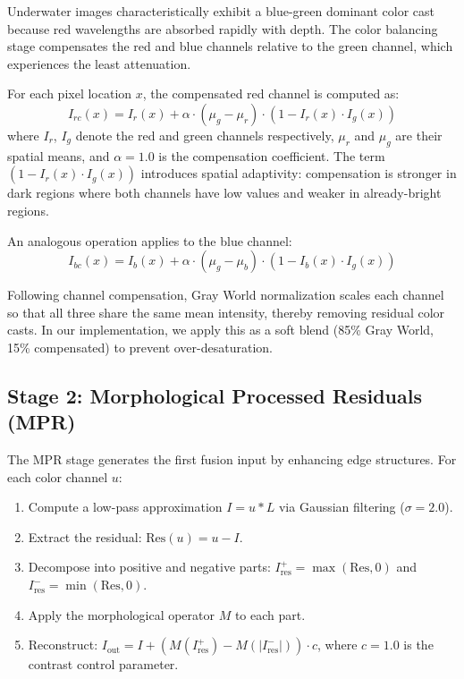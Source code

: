 \documentclass[conference]{IEEEtran}
\begin{document}
Underwater images characteristically exhibit a blue-green dominant color cast because red wavelengths are absorbed rapidly with depth. The color balancing stage compensates the red and blue channels relative to the green channel, which experiences the least attenuation.

For each pixel location $x$, the compensated red channel is computed as:
\begin{equation}
    I_{rc}(x) = I_r(x) + \alpha \cdot (\mu_g - \mu_r) \cdot (1 - I_r(x) \cdot I_g(x))
    \label{eq:red_comp}
\end{equation}
where $I_r$, $I_g$ denote the red and green channels respectively, $\mu_r$ and $\mu_g$ are their spatial means, and $\alpha = 1.0$ is the compensation coefficient. The term $(1 - I_r(x) \cdot I_g(x))$ introduces spatial adaptivity: compensation is stronger in dark regions where both channels have low values and weaker in already-bright regions.

An analogous operation applies to the blue channel:
\begin{equation}
    I_{bc}(x) = I_b(x) + \alpha \cdot (\mu_g - \mu_b) \cdot (1 - I_b(x) \cdot I_g(x))
    \label{eq:blue_comp}
\end{equation}

Following channel compensation, Gray World normalization scales each channel so that all three share the same mean intensity, thereby removing residual color casts. In our implementation, we apply this as a soft blend (85\% Gray World, 15\% compensated) to prevent over-desaturation.

\subsection{Stage 2: Morphological Processed Residuals (MPR)}

The MPR stage generates the first fusion input by enhancing edge structures. For each color channel $u$:

\begin{enumerate}
    \item Compute a low-pass approximation $I = u * L$ via Gaussian filtering ($\sigma = 2.0$).
    \item Extract the residual: $\text{Res}(u) = u - I$.
    \item Decompose into positive and negative parts: $I_{\text{res}}^{+} = \max(\text{Res}, 0)$ and $I_{\text{res}}^{-} = \min(\text{Res}, 0)$.
    \item Apply the morphological operator $M$ to each part.
    \item Reconstruct: $I_{\text{out}} = I + (M(I_{\text{res}}^{+}) - M(|I_{\text{res}}^{-}|)) \cdot c$, where $c=1.0$ is the contrast control parameter.
\end{enumerate}
\end{document}
